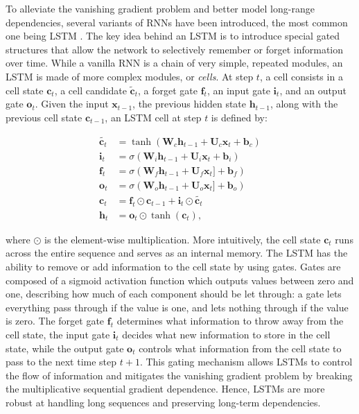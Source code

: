 To alleviate the vanishing gradient problem and better model long-range dependencies, several variants of \acp{RNN} have been introduced, the most common one being \ac{LSTM} \citep{hochreiter1997long}. The key idea behind an \ac{LSTM} is to introduce special gated structures that allow the network to selectively remember or forget information over time. While a vanilla \ac{RNN} is a chain of very simple, repeated modules, an \ac{LSTM} is made of more complex modules, or \textit{cells}. At step $t$, a cell consists in a cell state $\bm{c}_t$, a cell candidate $\tilde{\bm{c}}_t$, a forget gate $\bm{f}_t$, an input gate $\bm{i}_t$, and an output gate $\bm{o}_t$. Given the input $\bm{x}_{t-1}$, the previous hidden state $\bm{h}_{t-1}$, along with the previous cell state $\bm{c}_{t-1}$, an \ac{LSTM} cell at step $t$ is defined by:

\begin{equation}
\begin{aligned}
    \tilde{\bm{c}_t} &= \tanh \left( \bm{W}_c \bm{h}_{t-1} + \bm{U}_c \bm{x}_t + \bm{b}_c \right)\\
    \bm{i}_t         &= \sigma \left( \bm{W}_i \bm{h}_{t-1} + \bm{U}_i \bm{x}_t + \bm{b}_i \right) \\
    \bm{f}_t         &= \sigma \left( \bm{W}_f \bm{h}_{t-1} + \bm{U}_f \bm{x}_t] + \bm{b}_f \right) \\
    \bm{o}_t         &= \sigma \left( \bm{W}_o \bm{h}_{t-1} + \bm{U}_o \bm{x}_t] + \bm{b}_o \right) \\
    \bm{c}_t         &= \bm{f}_t \odot \bm{c}_{t-1} + \bm{i}_t \odot \tilde{\bm{c}_t} \\
    \bm{h}_t         &= \bm{o}_t \odot \tanh (\bm{c}_t),
\end{aligned}
\end{equation}

\noindent where $\odot$ is the element-wise multiplication. More intuitively, the cell state $\bm{c}_t$ runs across the entire sequence and serves as an internal memory. The LSTM has the ability to remove or add information to the cell state by using gates. Gates are composed of a sigmoid activation function which outputs values between zero and one, describing how much of each component should be let through: a gate lets everything pass through if the value is one, and lets nothing through if the value is zero. The forget gate $\bm{f}_t$ determines what information to throw away from the cell state, the input gate $\bm{i}_t$ decides what new information to store in the cell state, while the output gate $\bm{o}_t$ controls what information from the cell state to pass to the next time step $t+1$. This gating mechanism allows \acp{LSTM} to control the flow of information and mitigates the vanishing gradient problem by breaking the multiplicative sequential gradient dependence. Hence, \acp{LSTM} are more robust at handling long sequences and preserving long-term dependencies.

